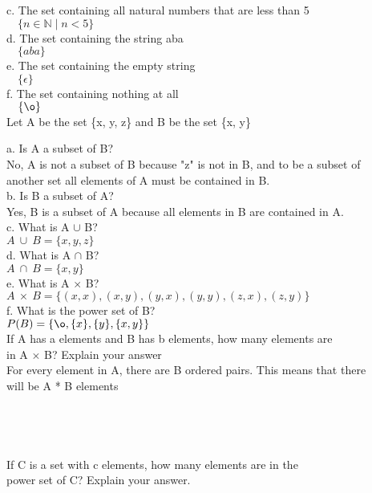 \documentclass[12pt]{article}
\begin{document}
c. The set containing all natural numbers that are less than 5 \\
\indent
$ \quad \{n \in \mathbb{N} \mid n < 5\} $ \\

d. The set containing the string aba \\
\indent
$ \quad \{aba\} $ \\

e. The set containing the empty string \\
\indent
$ \quad \{\epsilon\} $ \\

f. The set containing nothing at all \\
\indent
$ \quad \{\o\} $ \\

 \quad Let A be the set \{x, y, z\} and B be the set \{x, y\}

a. Is A a subset of B? \\
\indent
No, A is not a subset of B because "z" is not in B, and to be a subset of \\
\indent
another set all elements of A must be contained in B. \\

b. Is B a subset of A? \\
\indent
Yes, B is a subset of A because all elements in B are contained in A. \\

c. What is A $\cup$ B? \\
\indent
$ A \ \cup \ B = \{x,y,z\} $ \\

d. What is A $\cap$ B? \\
\indent
$ A \ \cap \ B = \{x,y\} $ \\

e. What is A $\times$ B? \\
\indent
$ A \ \times \ B = \{(x,x),(x,y),(y,x),(y,y),(z,x),(z,y)\} $ \\

f. What is the power set of B? \\
\indent
$ P(B) = \{\o, \{x\}, \{y\}, \{x, y\}\} $ \\

 \quad If A has a elements and B has b elements, how many elements are \\
\indent
\quad in A $\times$ B? Explain your answer \\

\indent
For every element in A, there are B ordered pairs. This means that there \\
\indent
will be A * B elements \\ \\
\\ \\ \\
 \quad If C is a set with c elements, how many elements are in the \\
\indent \quad power set of C? Explain your answer. \\
\end{document}

